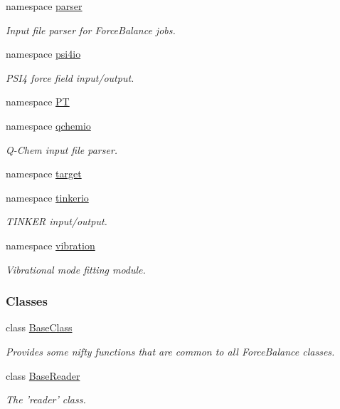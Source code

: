 \begin{DoxyCompactItemize}
\item 
namespace \hyperlink{namespaceforcebalance_1_1parser}{parser}
\begin{DoxyCompactList}\small\item\em \-Input file parser for \-Force\-Balance jobs. \end{DoxyCompactList}\item 
namespace \hyperlink{namespaceforcebalance_1_1psi4io}{psi4io}
\begin{DoxyCompactList}\small\item\em \-P\-S\-I4 force field input/output. \end{DoxyCompactList}\item 
namespace \hyperlink{namespaceforcebalance_1_1PT}{\-P\-T}
\item 
namespace \hyperlink{namespaceforcebalance_1_1qchemio}{qchemio}
\begin{DoxyCompactList}\small\item\em \-Q-\/\-Chem input file parser. \end{DoxyCompactList}\item 
namespace \hyperlink{namespaceforcebalance_1_1target}{target}
\item 
namespace \hyperlink{namespaceforcebalance_1_1tinkerio}{tinkerio}
\begin{DoxyCompactList}\small\item\em \-T\-I\-N\-K\-E\-R input/output. \end{DoxyCompactList}\item 
namespace \hyperlink{namespaceforcebalance_1_1vibration}{vibration}
\begin{DoxyCompactList}\small\item\em \-Vibrational mode fitting module. \end{DoxyCompactList}\end{DoxyCompactItemize}
\subsubsection*{\-Classes}
\begin{DoxyCompactItemize}
\item 
class \hyperlink{classforcebalance_1_1BaseClass}{\-Base\-Class}
\begin{DoxyCompactList}\small\item\em \-Provides some nifty functions that are common to all \-Force\-Balance classes. \end{DoxyCompactList}\item 
class \hyperlink{classforcebalance_1_1BaseReader}{\-Base\-Reader}
\begin{DoxyCompactList}\small\item\em \-The 'reader' class. \end{DoxyCompactList}\end{DoxyCompactItemize}
